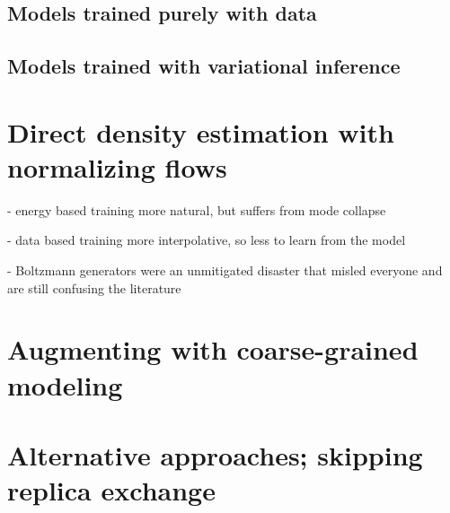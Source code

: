 \documentclass[final,3p,times,twocolumn]{elsarticle}
\begin{document}
\subsection{Models trained purely with data}

\subsection{Models trained with variational inference}


\section{Direct density estimation with normalizing flows}

- energy based training more natural, but suffers from mode collapse

- data based training more interpolative, so less to learn from the model

- Boltzmann generators were an unmitigated disaster that misled everyone and are still confusing the literature

\section{Augmenting with coarse-grained modeling}


\section{Alternative approaches; skipping replica exchange}








\begin{thebibliography}{00}


\bibitem[ ()]{}

\end{thebibliography}
\end{document}
